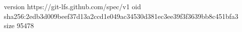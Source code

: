 version https://git-lfs.github.com/spec/v1
oid sha256:2edb3d009beef37d13a2ccd1e049ac34530d381ec3ee39f3f3639bb8c451bfa3
size 95478
